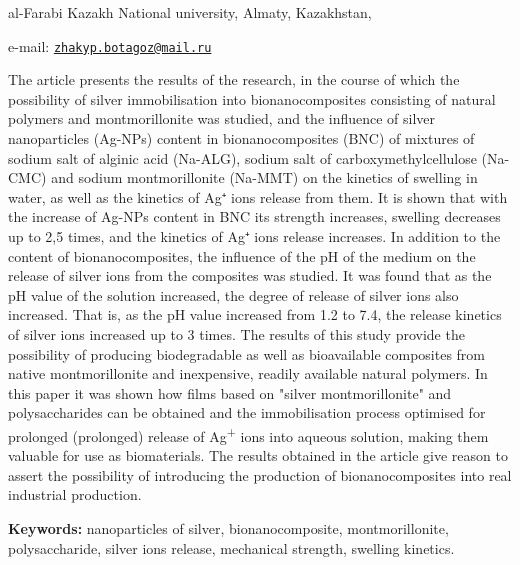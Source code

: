 \begin{affiliation}
al-Farabi Kazakh National university, Almaty, Kazakhstan,

e-mail:
\href{mailto:zhakyp.botagoz@mail.ru}{\nolinkurl{zhakyp.botagoz@mail.ru}}
\end{affiliation}

The article presents the results of the research, in the course of which
the possibility of silver immobilisation into bionanocomposites
consisting of natural polymers and montmorillonite was studied, and the
influence of silver nanoparticles (Ag-NPs) content in bionanocomposites
(BNC) of mixtures of sodium salt of alginic acid (Na-ALG), sodium salt
of carboxymethylcellulose (Na-CMC) and sodium montmorillonite (Na-MMT)
on the kinetics of swelling in water, as well as the kinetics of Ag⁺
ions release from them. It is shown that with the increase of Ag-NPs
content in BNC its strength increases, swelling decreases up to 2,5
times, and the kinetics of Ag⁺ ions release increases. In addition to
the content of bionanocomposites, the influence of the pH of the medium
on the release of silver ions from the composites was studied. It was
found that as the pH value of the solution increased, the degree of
release of silver ions also increased. That is, as the pH value
increased from 1.2 to 7.4, the release kinetics of silver ions increased
up to 3 times. The results of this study provide the possibility of
producing biodegradable as well as bioavailable composites from native
montmorillonite and inexpensive, readily available natural polymers. In
this paper it was shown how films based on "silver montmorillonite" and
polysaccharides can be obtained and the immobilisation process optimised
for prolonged (prolonged) release of Ag\textsuperscript{+} ions into
aqueous solution, making them valuable for use as biomaterials. The
results obtained in the article give reason to assert the possibility of
introducing the production of bionanocomposites into real industrial
production.

{\bfseries Keywords:} nanoparticles of silver, bionanocomposite,
montmorillonite, polysaccharide, silver ions release, mechanical
strength, swelling kinetics.

